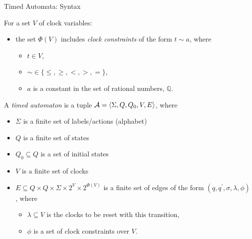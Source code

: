 \documentclass[10pt]{beamer}
\theoremstyle{plain}
\theoremstyle{definition}
\begin{document}
\begin{frame}{Timed Automata: Syntax}
	\begin{block}{}
		For a set $V$ of clock variables:
		\begin{itemize}
		\item
		the set $\Phi(V)$ includes \emph{clock constraints} of the form $t\sim a$, where 
			\begin{itemize}
				\item
				$t\in V$, 
				\item
				$\sim\in\{\leq, \geq, <, >, =\}$, 
				\item
				$a$ is a constant in the set of rational numbers, $\mathbb{Q}$.
			\end{itemize}
		\end{itemize}
	\end{block}
	A \emph{timed automaton} is a tuple ${\cal A} = \langle \Sigma, Q, Q_0, V, E \rangle$, where
	\begin{itemize}
		\item $\Sigma$  is a finite set of labels/actions (alphabet)
		\item $Q$ is a finite set of states
		\item $Q_0 \subseteq Q$ is a set of initial states
		\item $V$ is a finite set of clocks
		\item $E \subseteq Q \times Q \times \Sigma \times 2^{V} \times 2^{\Phi(V)}$ is a finite set of edges of the form $(q, q^\prime, \sigma, \lambda, \phi)$, where 
			\begin{itemize}
			\item
			$\lambda \subseteq V$ is the clocks to be reset with this transition, 
			\item
			$\phi$ is a set of clock constraints over $V$.
			\end{itemize}
	\end{itemize}
\end{frame}

\end{document}
